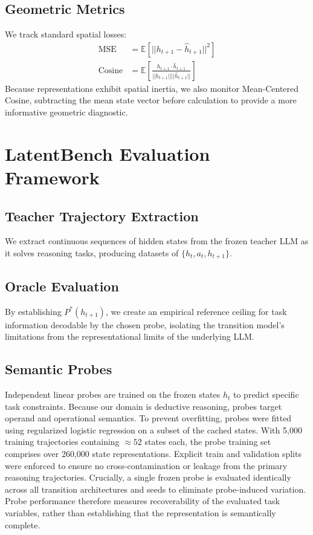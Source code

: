 \documentclass[conference]{IEEEtran}
\begin{document}
\subsection{Geometric Metrics}
We track standard spatial losses:
\begin{align}
\operatorname{MSE} &= \mathbb{E}[||h_{t+1} - \hat h_{t+1}||^2] \\
\operatorname{Cosine} &= \mathbb{E}\left[\frac{h_{t+1} \cdot \hat h_{t+1}}{||h_{t+1}|| ||\hat h_{t+1}||}\right]
\end{align}
Because representations exhibit spatial inertia, we also monitor Mean-Centered Cosine, subtracting the mean state vector before calculation to provide a more informative geometric diagnostic.

\section{LatentBench Evaluation Framework}

\subsection{Teacher Trajectory Extraction}
We extract continuous sequences of hidden states from the frozen teacher LLM as it solves reasoning tasks, producing datasets of $\{h_t, a_t, h_{t+1}\}$.

\subsection{Oracle Evaluation}
By establishing $P^*(h_{t+1})$, we create an empirical reference ceiling for task information decodable by the chosen probe, isolating the transition model's limitations from the representational limits of the underlying LLM.

\subsection{Semantic Probes}
Independent linear probes are trained on the frozen states $h_t$ to predict specific task constraints. Because our domain is deductive reasoning, probes target operand and operational semantics. To prevent overfitting, probes were fitted using regularized logistic regression on a subset of the cached states. With 5,000 training trajectories containing $\approx 52$ states each, the probe training set comprises over 260,000 state representations. Explicit train and validation splits were enforced to ensure no cross-contamination or leakage from the primary reasoning trajectories. Crucially, a single frozen probe is evaluated identically across all transition architectures and seeds to eliminate probe-induced variation. Probe performance therefore measures recoverability of the evaluated task variables, rather than establishing that the representation is semantically complete.
\end{document}
